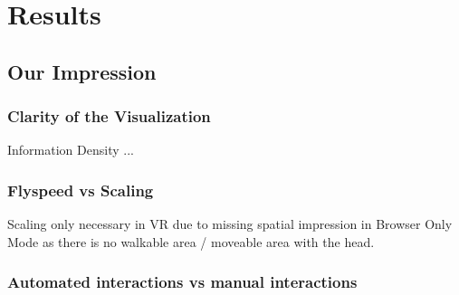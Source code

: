 \chapter{Results}

\section{Our Impression}

\subsection{Clarity of the Visualization}
Information Density ...

\subsection{Flyspeed vs Scaling}
Scaling only necessary in VR due to missing 
spatial impression in Browser Only Mode as there is no walkable area / moveable area with the head.

\subsection{Automated interactions vs manual interactions}